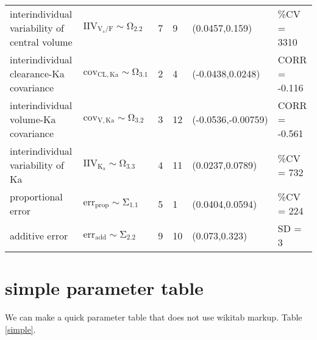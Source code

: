 \begin{table}[!htpb]
\begin{center}
\begin{tabular}{llllll}
   interindividual variability of central volume & $\mathrm{IIV_{V_{c}/F}\sim \Omega_{2.2}}$                                                                  & 7 $  $      & 9  & (0.0457,0.159)     & \%CV = 3310  \\
   interindividual clearance-Ka covariance       & $\mathrm{cov_{CL,Ka} \sim \Omega_{3.1}}$                                                                   & 2 $  $      & 4  & (-0.0438,0.0248)   & CORR = -0.116 \\
   interindividual volume-Ka covariance          & $\mathrm{cov_{V,Ka} \sim \Omega_{3.2}}$                                                                    & 3 $  $      & 12 & (-0.0536,-0.00759) & CORR = -0.561 \\
   interindividual variability of Ka             & $\mathrm{IIV_{K_{a}}\sim \Omega_{3.3}}$                                                                    & 4 $  $      & 11 & (0.0237,0.0789)    & \%CV = 732   \\
   proportional error                            & $\mathrm{err_{prop}\sim \Sigma_{1.1}}$                                                                     & 5 $  $      & 1  & (0.0404,0.0594)    & \%CV = 224   \\
   additive error                                & $\mathrm{err_{add}\sim \Sigma_{2.2}}$                                                                      & 9 $  $      & 10 & (0.073,0.323)      & SD = 3        \\ \hline
  \end{tabular}
 \end{center}
\end{table}\section{simple parameter table}
We can make a quick parameter table that does not use wikitab markup. Table \ref{simple}.
